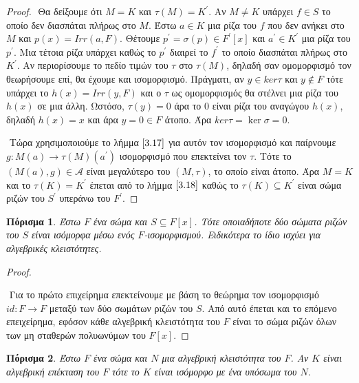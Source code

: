 \documentclass[oneside,a4paper]{article}
\newtheorem{cor}{Πόρισμα}
\begin{document}
\begin{proof}
	$ $\newline
	Θα δείξουμε ότι $M=K$ και $\tau (M) = K^{\prime}$. Αν $M\neq K$ υπάρχει $f \in S$ το οποίο δεν διασπάται πλήρως στο $M$. Έστω $a \in K$ μια ρίζα του $f$ που δεν ανήκει στο $M$ και $p(x) = Irr(a,F)$. Θέτουμε $p^{\prime} = \sigma (p) \in F^{\prime}[x]$ και $a^{\prime} \in K^{\prime}$ μια ρίζα του $p^{\prime}$. Μια τέτοια ρίζα υπάρχει καθώς το $p^{\prime}$ διαιρεί το $f^{\prime}$ το οποίο διασπάται πλήρως στο $K^{\prime}$. Αν περιορίσουμε το πεδίο τιμών του $\tau$ στο $\tau (M)$, δηλαδή σαν ομομορφισμό τον θεωρήσουμε επί, θα έχουμε και ισομορφισμό. Πράγματι, αν $y \in ker\tau$ και $y \not \in F$ τότε υπάρχει το $h(x) = Irr(y,F)$ και ο $\tau$ ως ομομορφισμός θα στέλνει μια ρίζα του $h(x)$ σε μια άλλη. Ωστόσο, $\tau (y) = 0$ άρα το $0$ είναι ρίζα του αναγώγου $h(x)$, δηλαδή $h(x) = x$ και άρα $y = 0 \in F$ άτοπο. Άρα $ker\tau = \ker\sigma = 0$.
	
	$ $\newline
	Τώρα χρησιμοποιούμε το λήμμα $\ref{3.17}$ για αυτόν τον ισομορφισμό και παίρνουμε $g: M(a) \rightarrow \tau (M) (a^{\prime})$ ισομορφισμό που επεκτείνει τον $\tau$. Τότε το $(M(a),g) \in \mathcal A$ είναι μεγαλύτερο του $(M,\tau)$, το οποίο είναι άτοπο. Άρα $M=K$ και το $\tau (K) =K^{\prime}$ έπεται από το λήμμα $\ref{3.18}$ καθώς το $\tau(K) \subseteq K^{\prime}$ είναι σώμα ριζών του $S^{\prime}$ υπεράνω του $F^{\prime}$.
\end{proof}
\vspace{0.1cm}
\begin{cor} Έστω $F$ ένα σώμα και $S\subseteq F[x]$. Τότε οποιαδήποτε δύο σώματα ριζών του $S$ είναι ισόμορφα μέσω ενός $F$-ισομορφισμού. Ειδικότερα το ίδιο ισχύει για αλγεβρικές κλειστότητες.
\end{cor}

\begin{proof} $ $

	$ $\newline
	Για το πρώτο επιχείρημα επεκτείνουμε με βάση το θεώρημα τον ισομορφισμό $id: F\rightarrow F$ μεταξύ των δύο σωμάτων ριζών του $S$. Από αυτό έπεται και το επόμενο επειχείρημα, εφόσον κάθε αλγεβρική κλειστότητα του $F$ είναι το σώμα ριζών όλων των μη σταθερών πολυωνύμων του $F[x]$.

\end{proof}
\vspace{0.1cm}
\begin{cor}Έστω $F$ ένα σώμα και $N$ μια αλγεβρική κλειστότητα του $F$. Αν $K$ είναι αλγεβρική επέκταση του $F$ τότε το $K$ είναι ισόμορφο με ένα υπόσωμα του $N$.
\end{cor}
\end{document}
